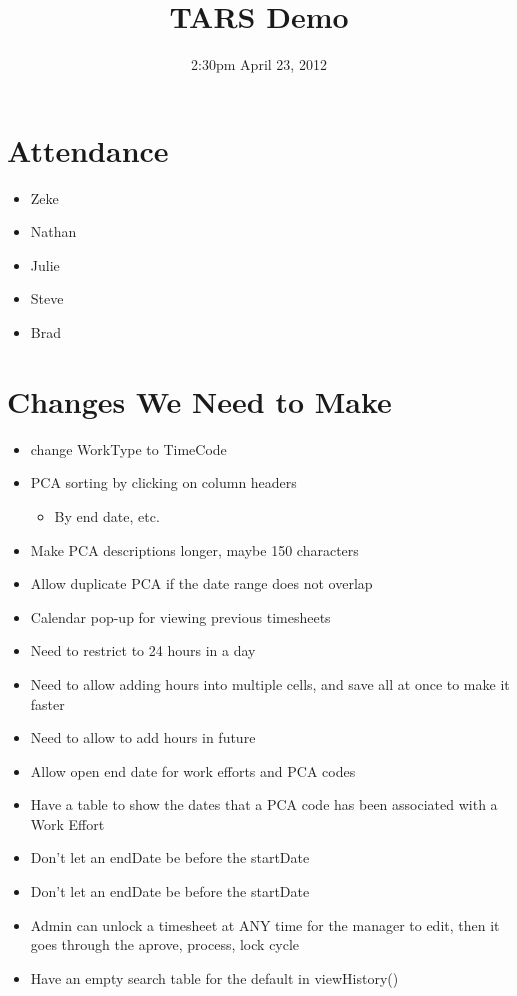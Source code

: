 \documentclass{article}
\begin{document}
\title{TARS Demo}
\date{2:30pm April 23, 2012}
\maketitle

\section{Attendance}
\begin{itemize}
\item Zeke
\item Nathan 
\item Julie
\item Steve
\item Brad
\end{itemize}

\section{Changes We Need to Make}
\begin{itemize}
\item change WorkType to TimeCode
\item PCA sorting by clicking on column headers
	\begin{itemize}
	\item By end date, etc.
	\end{itemize}
\item Make PCA descriptions longer, maybe 150 characters
\item Allow duplicate PCA if the date range does not overlap
\item Calendar pop-up for viewing previous timesheets
\item Need to restrict to 24 hours in a day
\item Need to allow adding hours into multiple cells, and save all at once to make it faster
\item Need to allow to add hours in future
\item Allow open end date for work efforts and PCA codes
\item Have a table to show the dates that a PCA code has been associated with a Work Effort
\item Don't let an endDate be before the startDate
\item Don't let an endDate be before the startDate
\item Admin can unlock a timesheet at ANY time for the manager to edit, then it goes through the aprove, process, lock cycle
\item Have an empty search table for the default in viewHistory()
\end{itemize}
\end{document}
